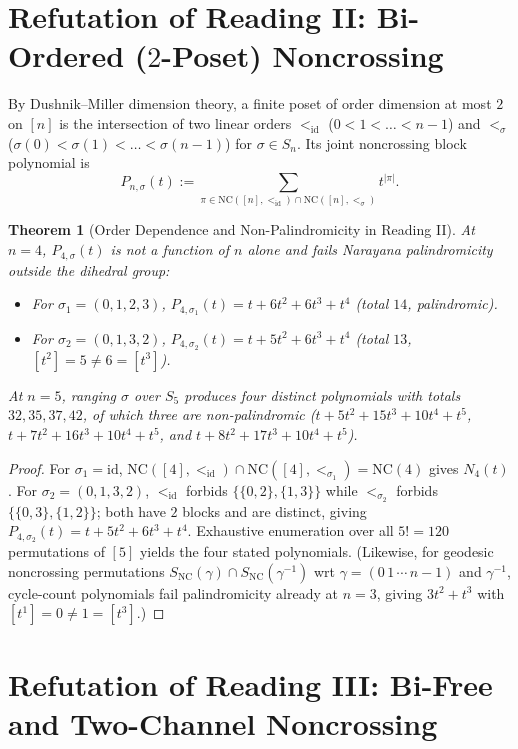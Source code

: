\documentclass[11pt]{article}
\theoremstyle{plain}
\newtheorem{theorem}{Theorem}[section]
\theoremstyle{definition}
\newcommand{\NC}{\mathrm{NC}}
\begin{document}
\section{Refutation of Reading II: Bi-Ordered ($2$-Poset) Noncrossing}

By Dushnik--Miller dimension theory, a finite poset of order dimension at most $2$ on $[n]$ is the intersection of two linear orders $<_{\mathrm{id}}$ ($0 < 1 < \dots < n-1$) and $<_\sigma$ ($\sigma(0) < \sigma(1) < \dots < \sigma(n-1)$) for $\sigma \in S_n$. Its joint noncrossing block polynomial is
\[
  P_{n,\sigma}(t) := \sum_{\pi \in \NC([n], <_{\mathrm{id}}) \cap \NC([n], <_\sigma)} t^{|\pi|}.
\]

\begin{theorem}[Order Dependence and Non-Palindromicity in Reading II]\label{thm:poset-disproof}
At $n = 4$, $P_{4,\sigma}(t)$ is not a function of $n$ alone and fails Narayana palindromicity outside the dihedral group:
\begin{itemize}\setlength{\itemsep}{2pt}
  \item[(1)] For $\sigma_1 = (0, 1, 2, 3)$, $P_{4,\sigma_1}(t) = t + 6t^2 + 6t^3 + t^4$ (total $14$, palindromic).
  \item[(2)] For $\sigma_2 = (0, 1, 3, 2)$, $P_{4,\sigma_2}(t) = t + 5t^2 + 6t^3 + t^4$ (total $13$, $[t^2] = 5 \ne 6 = [t^3]$).
\end{itemize}
At $n = 5$, ranging $\sigma$ over $S_5$ produces four distinct polynomials with totals $32, 35, 37, 42$, of which three are non-palindromic ($t + 5t^2 + 15t^3 + 10t^4 + t^5$, $t + 7t^2 + 16t^3 + 10t^4 + t^5$, and $t + 8t^2 + 17t^3 + 10t^4 + t^5$).
\end{theorem}
\begin{proof}
For $\sigma_1 = \mathrm{id}$, $\NC([4], <_{\mathrm{id}}) \cap \NC([4], <_{\sigma_1}) = \NC(4)$ gives $N_4(t)$. For $\sigma_2 = (0, 1, 3, 2)$, $<_{\mathrm{id}}$ forbids $\{\{0, 2\}, \{1, 3\}\}$ while $<_{\sigma_2}$ forbids $\{\{0, 3\}, \{1, 2\}\}$; both have $2$ blocks and are distinct, giving $P_{4,\sigma_2}(t) = t + 5t^2 + 6t^3 + t^4$. Exhaustive enumeration over all $5! = 120$ permutations of $[5]$ yields the four stated polynomials. (Likewise, for geodesic noncrossing permutations $S_{\NC}(\gamma) \cap S_{\NC}(\gamma^{-1})$ wrt $\gamma = (0\,1\,\cdots\,n-1)$ and $\gamma^{-1}$, cycle-count polynomials fail palindromicity already at $n = 3$, giving $3t^2 + t^3$ with $[t^1] = 0 \ne 1 = [t^3]$.)
\end{proof}

\section{Refutation of Reading III: Bi-Free and Two-Channel Noncrossing}
\end{document}
